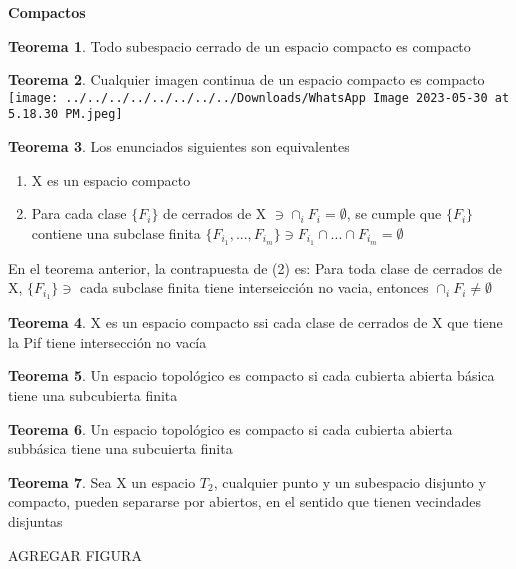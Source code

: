 \documentclass{article}
\theoremstyle{definition}
\newtheorem{theorem}{Teorema}[section]
\begin{document}
\textbf{Compactos}

\begin{theorem}
	Todo subespacio cerrado de un espacio compacto es compacto
\end{theorem}


\begin{theorem}
	Cualquier imagen continua de un espacio compacto es compacto\\
	\texttt{[image: ../../../../../../../../Downloads/WhatsApp Image 2023-05-30 at 5.18.30 PM.jpeg]} 
\end{theorem}


\begin{theorem}
	Los enunciados siguientes son equivalentes
	\begin{enumerate}
	\item X es un espacio compacto
	\item Para cada clase $\{F_i\}$ de cerrados de X $\ni\cap_iF_i=\emptyset$, se cumple que $\{F_i\}$ contiene una subclase finita $\{F_{i_1},...,F_{i_m}\}\ni F_{i_1}\cap ...\cap F_{i_m}=\emptyset$
\end{enumerate}
En el teorema anterior, la contrapuesta de (2) es: Para toda clase de cerrados de X, $\{F_{i_1}\}\ni$ cada subclase finita tiene interseicción no vacia, entonces $\cap_iF_i\neq\emptyset$ 
\end{theorem}


\begin{theorem}
	X es un espacio compacto ssi cada clase de cerrados de X que tiene la Pif tiene intersección no vacía
\end{theorem}


\begin{theorem}

	Un espacio topológico es compacto si cada cubierta abierta básica tiene una subcubierta finita
\end{theorem}


\begin{theorem}
	Un espacio topológico es compacto si cada cubierta abierta subbásica tiene una subcuierta finita
\end{theorem}


\begin{theorem}
	Sea X un espacio $T_2$, cualquier punto y un subespacio disjunto y compacto, pueden separarse por abiertos, en el sentido que tienen vecindades disjuntas
	
	AGREGAR FIGURA
\end{theorem}
\end{document}
